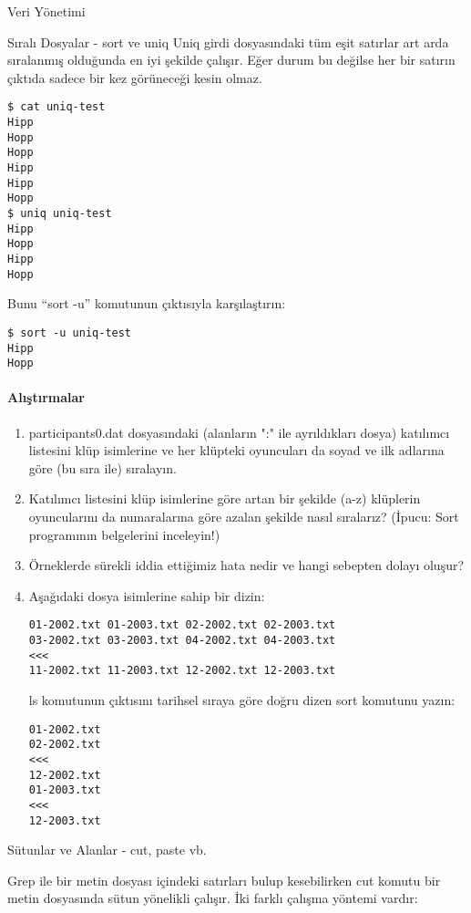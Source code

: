 \begin{section}{Veri Yönetimi}
\begin{subsection}{Sıralı Dosyalar - sort ve uniq}
Uniq girdi dosyasındaki tüm eşit satırlar art arda sıralanmış olduğunda en iyi şekilde çalışır. Eğer durum bu değilse her bir satırın çıktıda sadece bir kez görüneceği kesin olmaz.

\begin{verbatim}
$ cat uniq-test
Hipp
Hopp
Hopp
Hipp
Hipp
Hopp
$ uniq uniq-test
Hipp
Hopp
Hipp
Hopp
\end{verbatim}

Bunu “sort -u” komutunun çıktısıyla karşılaştırın:

\begin{verbatim}
$ sort -u uniq-test
Hipp
Hopp
\end{verbatim}

\paragraph{{\Huge{\PencilLeftDown}}Alıştırmalar}{
\begin{enumerate}
 \item participants0.dat dosyasındaki (alanların ":" ile ayrıldıkları dosya) katılımcı listesini klüp isimlerine ve her klüpteki oyuncuları da soyad ve ilk adlarına göre (bu sıra ile) sıralayın.
 \item Katılımcı listesini klüp isimlerine göre artan bir şekilde (a-z) klüplerin oyuncularını da numaralarına göre azalan şekilde nasıl sıralarız? (İpucu: Sort programının belgelerini inceleyin!)
 \item Örneklerde sürekli iddia ettiğimiz hata nedir ve hangi sebepten dolayı oluşur?
 \item Aşağıdaki dosya isimlerine sahip bir dizin:
 \begin{verbatim}
01-2002.txt 01-2003.txt 02-2002.txt 02-2003.txt
03-2002.txt 03-2003.txt 04-2002.txt 04-2003.txt
<<<
11-2002.txt 11-2003.txt 12-2002.txt 12-2003.txt
 \end{verbatim}
 ls komutunun çıktısını tarihsel sıraya göre doğru dizen sort komutunu yazın:
 \begin{verbatim}
01-2002.txt
02-2002.txt
<<<
12-2002.txt
01-2003.txt
<<<
12-2003.txt
 \end{verbatim}
\end{enumerate}}

\end{subsection}

\begin{subsection}{Sütunlar ve Alanlar - cut, paste vb.}

Grep ile bir metin dosyası içindeki satırları bulup kesebilirken cut komutu bir metin dosyasında sütun yönelikli çalışır. İki farklı çalışma yöntemi vardır:


\end{subsection}
\end{section}
